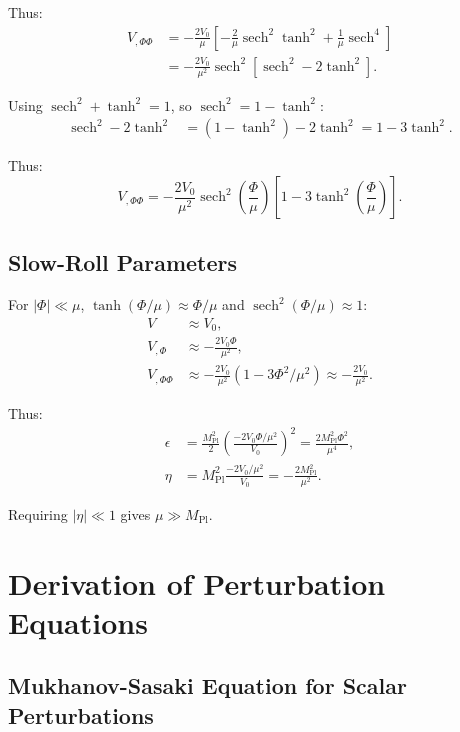 \documentclass[11pt,a4paper]{article}
\numberwithin{equation}{section}
\theoremstyle{plain}
\theoremstyle{definition}
\theoremstyle{remark}
\begin{document}
Thus:
\begin{align}
V_{,\Phi\Phi} &= -\frac{2V_0}{\mu}\left[-\frac{2}{\mu}\operatorname{sech}^2\tanh^2 + \frac{1}{\mu}\operatorname{sech}^4\right]\\
&= -\frac{2V_0}{\mu^2}\operatorname{sech}^2\left[\operatorname{sech}^2 - 2\tanh^2\right].
\end{align}

Using $\operatorname{sech}^2 + \tanh^2 = 1$, so $\operatorname{sech}^2 = 1 - \tanh^2$:
\begin{align}
\operatorname{sech}^2 - 2\tanh^2 &= (1 - \tanh^2) - 2\tanh^2 = 1 - 3\tanh^2.
\end{align}

Thus:
\begin{equation}
V_{,\Phi\Phi} = -\frac{2V_0}{\mu^2}\operatorname{sech}^2\left(\frac{\Phi}{\mu}\right)\left[1 - 3\tanh^2\left(\frac{\Phi}{\mu}\right)\right].
\end{equation}

\subsection{Slow-Roll Parameters}

For $|\Phi| \ll \mu$, $\tanh(\Phi/\mu) \approx \Phi/\mu$ and $\operatorname{sech}^2(\Phi/\mu) \approx 1$:
\begin{align}
V &\approx V_0,\\
V_{,\Phi} &\approx -\frac{2V_0\Phi}{\mu^2},\\
V_{,\Phi\Phi} &\approx -\frac{2V_0}{\mu^2}(1 - 3\Phi^2/\mu^2) \approx -\frac{2V_0}{\mu^2}.
\end{align}

Thus:
\begin{align}
\epsilon &= \frac{M_{\mathrm{Pl}}^2}{2}\left(\frac{-2V_0\Phi/\mu^2}{V_0}\right)^2 = \frac{2M_{\mathrm{Pl}}^2\Phi^2}{\mu^4},\\
\eta &= M_{\mathrm{Pl}}^2\frac{-2V_0/\mu^2}{V_0} = -\frac{2M_{\mathrm{Pl}}^2}{\mu^2}.
\end{align}

Requiring $|\eta| \ll 1$ gives $\mu \gg M_{\mathrm{Pl}}$.

\section{Derivation of Perturbation Equations}
\label{app:pert}

\subsection{Mukhanov-Sasaki Equation for Scalar Perturbations}
\end{document}
